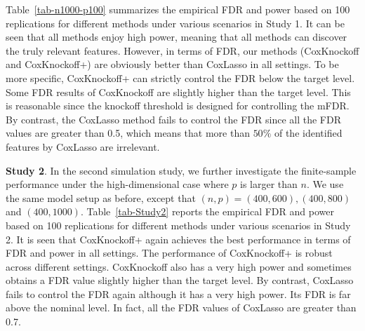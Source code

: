 \documentclass[11pt]{article}
\begin{document}
Table~\ref{tab-n1000-p100} summarizes the empirical FDR and power based on 100 replications for different methods 
under various scenarios in Study 1. 
It can be seen that all methods enjoy high power, meaning that all methods can discover the truly relevant features. However, in terms of FDR, our methods (CoxKnockoff and CoxKnockoff+) are obviously better than CoxLasso in all settings. To be more specific, CoxKnockoff+  
can strictly control the FDR below the target level. Some FDR results of CoxKnockoff 
are slightly higher than the target level. This is reasonable since the knockoff threshold is designed for controlling the mFDR. By contrast, the CoxLasso method fails to control the FDR 
since all the FDR values are greater than 0.5, which means that more than $50\%$ of the identified features by CoxLasso are irrelevant.



{\bf Study 2}. In the second simulation study, we further investigate the finite-sample performance under the high-dimensional case 
where $p$ is larger than $n$.
We use the same model setup as before, except that $(n, p)=(400, 600), (400, 800)$ and $(400, 1000)$. 
Table~\ref{tab-Study2} reports the empirical FDR and power based on 100 replications for different methods 
under various scenarios in Study 2. 
It is seen that CoxKnockoff+ again achieves the best performance in terms of FDR and power in all settings. The performance of CoxKnockoff+ is robust
across different settings.
CoxKnockoff also has a very high power and sometimes obtains a FDR value slightly higher than the target level.
By contrast, CoxLasso fails to control the FDR again although it has a very high power. Its FDR is far above the nominal level. In fact, all the FDR values of CoxLasso are greater than 0.7.
\end{document}
